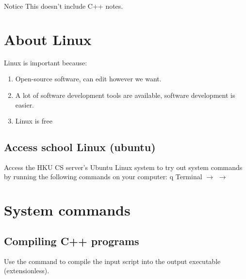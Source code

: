 \documentclass{article}
\begin{document}



\begin{knBox}
      {Notice}
      This doesn't include C++ notes.
\end{knBox}

\section{About Linux}
Linux is important because:
\begin{enumerate}
      \item Open-source software, can edit however we want.
      \item A lot of software development tools are available, software development is easier.
      \item Linux is free
\end{enumerate}

\subsection{Access school Linux (ubuntu)}
Access the HKU CS server's Ubuntu Linux system to try out system commands by running the following commands on your computer:
q
Terminal $\to$  $\to$ 

\section{System commands}

\subsection*{Compiling C++ programs}
Use the command  to compile the input script into the output executable (extensionless).
\end{document}
